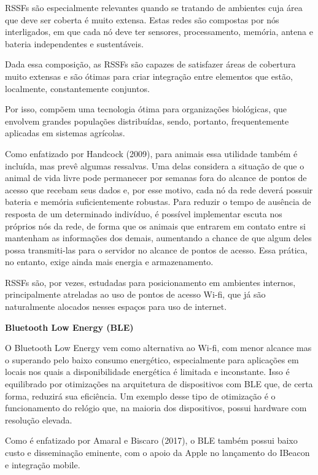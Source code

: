 RSSFs são especialmente relevantes quando se tratando de ambientes cuja área que deve ser coberta é muito extensa. Estas redes são compostas por nós interligados, em que cada nó deve ter sensores, processamento, memória, antena e bateria independentes e sustentáveis.

Dada essa composição, as RSSFs são capazes de satisfazer áreas de cobertura muito extensas e são ótimas para criar integração entre elementos que estão, localmente, constantemente conjuntos.

Por isso, compõem uma tecnologia ótima para organizações biológicas, que envolvem grandes populações distribuídas, sendo, portanto, frequentemente aplicadas em sistemas agrícolas.

Como enfatizado por Handcock (2009), para animais essa utilidade também é incluída, mas prevê algumas ressalvas. Uma delas considera a situação de que o animal de vida livre pode permanecer por semanas fora do alcance de pontos de acesso que recebam seus dados e, por esse motivo, cada nó da rede deverá possuir bateria e memória suficientemente robustas. Para reduzir o tempo de ausência de resposta de um determinado indivíduo, é possível implementar escuta nos próprios nós da rede, de forma que os animais que entrarem em contato entre si mantenham as informações dos demais, aumentando a chance de que algum deles possa transmiti-las para o servidor no alcance de pontos de acesso. Essa prática, no entanto, exige ainda mais energia e armazenamento.

RSSFs são, por vezes, estudadas para posicionamento em ambientes internos, principalmente atreladas ao uso de pontos de acesso Wi-fi, que já são naturalmente alocados nesses espaços para uso de internet.

\textbf{Bluetooth Low Energy (BLE)}

O Bluetooth Low Energy vem como alternativa ao Wi-fi, com menor alcance mas o superando pelo baixo consumo energético, especialmente para aplicações em locais nos quais a disponibilidade energética é limitada e inconstante. Isso é equilibrado por otimizações na arquitetura de dispositivos com BLE que, de certa forma, reduzirá sua eficiência. Um exemplo desse tipo de otimização é o funcionamento do relógio que, na maioria dos dispositivos, possui hardware com resolução elevada.

Como é enfatizado por Amaral e Biscaro (2017), o BLE também possui baixo custo e disseminação eminente, com o apoio da Apple no lançamento do IBeacon e integração mobile.

